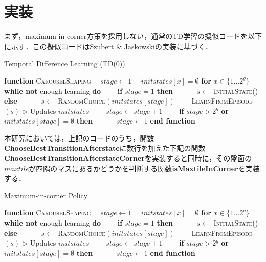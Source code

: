 \documentclass{suribt}
\begin{document}
\section{実装}
まず，maximum-in-corner方策を採用しない，通常のTD学習の擬似コードを以下に示す．この擬似コードはSzubert \& Jaskowskiの実装に基づく．

\begin{algorithm}
\caption{Temporal Difference Learning (TD(0))}
\label{alg2}
\begin{algorithmic}[1]
\STATE \textbf{function} \textsc{CarouselShaping}
\STATE 　$stage \leftarrow 1$
\STATE 　$initstates[x] = \emptyset$ \textbf{for} $x \in \{1...2^g\}$
\STATE 　\textbf{while not} enough learning \textbf{do}
\STATE 　　\textbf{if} $stage = 1$ \textbf{then}
\STATE 　　　$s \leftarrow$ \textsc{InitialState()}
\STATE 　　\textbf{else}
\STATE 　　　$s \leftarrow$ \textsc{RandomChoice}$(initstates[stage])$
\STATE 　　\textsc{LearnFromEpisode}$(s)$ $\triangleright$ Updates $initstates$
\STATE 　　$stage \leftarrow stage + 1$
\STATE 　　\textbf{if} $stage > 2^g$ \textbf{or} $initstates[stage] = \emptyset$ \textbf{then}
\STATE 　　　$stage \leftarrow 1$
\STATE \textbf{end function}
\end{algorithmic}
\end{algorithm}

本研究においては，上記のコードのうち，関数\textbf{ChooseBestTransitionAfterstate}に数行を加えた下記の関数\textbf{ChooseBestTransitionAfterstateCorner}を実装すると同時に，その盤面の$maxtile$が四隅のマスにあるかどうかを判断する関数\textbf{isMaxtileInCorner}を実装する．

\begin{algorithm}
\caption{Maximum-in-corner Policy}
\label{alg3}
\begin{algorithmic}[1]
\STATE \textbf{function} \textsc{CarouselShaping}
\STATE 　$stage \leftarrow 1$
\STATE 　$initstates[x] = \emptyset$ \textbf{for} $x \in \{1...2^g\}$
\STATE 　\textbf{while not} enough learning \textbf{do}
\STATE 　　\textbf{if} $stage = 1$ \textbf{then}
\STATE 　　　$s \leftarrow$ \textsc{InitialState()}
\STATE 　　\textbf{else}
\STATE 　　　$s \leftarrow$ \textsc{RandomChoice}$(initstates[stage])$
\STATE 　　\textsc{LearnFromEpisode}$(s)$ $\triangleright$ Updates $initstates$
\STATE 　　$stage \leftarrow stage + 1$
\STATE 　　\textbf{if} $stage > 2^g$ \textbf{or} $initstates[stage] = \emptyset$ \textbf{then}
\STATE 　　　$stage \leftarrow 1$
\STATE \textbf{end function}
\end{algorithmic}
\end{algorithm}
\end{document}
